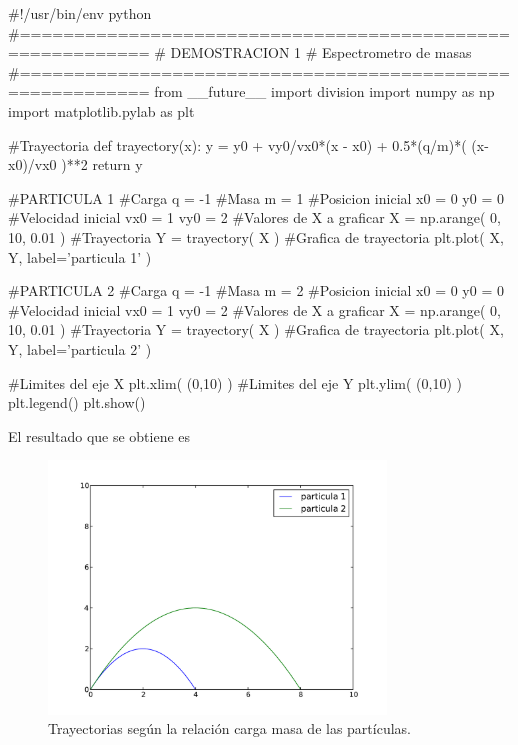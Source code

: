\newpage
\begin{listing}[style=python]
#!/usr/bin/env python
#==========================================================
# DEMOSTRACION 1
# Espectrometro de masas
#==========================================================
from __future__ import division
import numpy as np
import matplotlib.pylab as plt

#Trayectoria
def trayectory(x):
    y = y0 + vy0/vx0*(x - x0) + 0.5*(q/m)*( (x-x0)/vx0 )**2
    return y
    
#PARTICULA 1
#Carga
q = -1
#Masa
m = 1
#Posicion inicial
x0 = 0
y0 = 0
#Velocidad inicial
vx0 = 1
vy0 = 2
#Valores de X a graficar
X = np.arange( 0, 10, 0.01 )
#Trayectoria
Y = trayectory( X )
#Grafica de trayectoria
plt.plot( X, Y, label='particula 1' )

#PARTICULA 2
#Carga
q = -1
#Masa
m = 2
#Posicion inicial
x0 = 0
y0 = 0
#Velocidad inicial
vx0 = 1
vy0 = 2
#Valores de X a graficar
X = np.arange( 0, 10, 0.01 )
#Trayectoria
Y = trayectory( X )
#Grafica de trayectoria
plt.plot( X, Y, label='particula 2' )

#Limites del eje X
plt.xlim( (0,10) )
#Limites del eje Y
plt.ylim( (0,10) )
plt.legend()
plt.show()
\end{listing}


El resultado que se obtiene es


\begin{figure}[htbp]
	\centering
	\includegraphics[width=0.8\textwidth]
	{./pictures/demo2_01.pdf}

	\caption{\small{Trayectorias según la relación carga masa de las 
	partículas.}}
	
	\label{fig:trayectories}
\end{figure}


